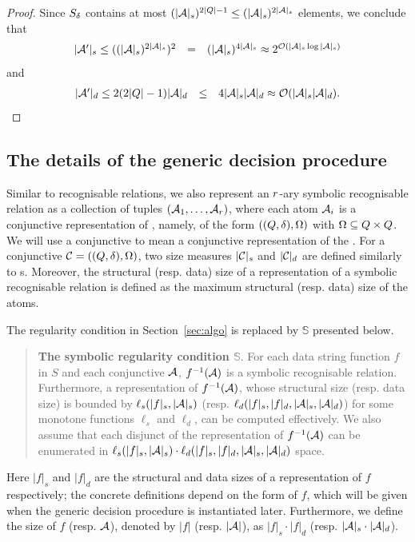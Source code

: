 \begin{proof}
Since $S_{\delta}$ contains at most $(|\mathcal{A}|_s)^{2 |Q|-1} \le (|\mathcal{A}|_s)^{2 |\mathcal{A}|_s}$ elements, we conclude that 
$$
\begin{array}{l c l}
|\mathcal{A}'|_s \le ((|\mathcal{A}|_s)^{2|\mathcal{A}|_s})^2  & = & (|\mathcal{A}|_s)^{4|\mathcal{A}|_s} 
 \approx    2^{\mathcal{O}\left(|\mathcal{A}|_s \log |\mathcal{A}|_s\right)}
\end{array}
$$ 
and 
$$
\begin{array}{l c l}
|\mathcal{A}'|_d \le 2(2|Q|-1) |\mathcal{A}|_d & \le & 4 |\mathcal{A}|_s |\mathcal{A}|_d 
\approx   \mathcal{O}( |\mathcal{A}|_s |\mathcal{A}|_d).
\end{array}
$$
\end{proof}




\subsection{The details of the generic decision procedure}


Similar to recognisable relations, we also represent an  $r$-ary symbolic recognisable relation as a collection of tuples $(\mathcal{A}_1, \ldots, \mathcal{A}_r)$, where each atom $\mathcal{A}_i$ is a conjunctive representation of \SA{}, namely, of the form $((Q, \delta), \Omega)$ with $\Omega \subseteq Q \times Q$. We will use a conjunctive \SA{} to mean a conjunctive representation of the \SA{}. For a conjunctive \SA{} $\mathcal{C}= ((Q, \delta), \Omega)$, two size measures $|\mathcal{C}|_s$ and $|\mathcal{C}|_d$ are defined similarly to \SA{}s. Moreover, the structural (resp. data) size of a representation of a symbolic recognisable relation is defined as the maximum structural (resp. data) size of the atoms.


The regularity condition \prerec{}  in Section~\ref{sec:algo} is replaced by $\mathbb{S}$\prerec{} presented below.
\begin{quote}
{\bf The symbolic regularity condition $\mathbb{S}$\prerec{}}. For each data string function $f$ in $S$ and each conjunctive \SA{} $\mathcal{A}$,  $f^{-1}(\mathcal{A})$ is a symbolic recognisable relation. Furthermore, 
a representation of $f^{-1}(\mathcal{A})$, whose structural size (resp. data size) is bounded by  $\ell_s(|f|_s, |\mathcal{A}|_s)$ (resp. $\ell_d(|f|_s,  |f|_d, |\mathcal{A}|_s, |\mathcal{A}|_d)$) for some monotone functions $\ell_s$ and $\ell_d$, can be computed effectively. We also assume that each disjunct of the representation of $f^{-1}(\mathcal{A})$ can be enumerated in $\ell_s(|f|_s, |\mathcal{A}|_s) \cdot \ell_d(|f|_s,  |f|_d, |\mathcal{A}|_s,  |\mathcal{A}|_d)$ space.
%
\end{quote} 
%
Here $|f|_s$ and $|f|_d$ are the structural and data sizes of a representation of $f$ respectively; the concrete definitions depend on the form of $f$, which will be given when the generic decision procedure is instantiated later. Furthermore, we define the size of $f$ (resp. $\mathcal{A}$), denoted by $|f|$ (resp. $|\mathcal{A}|$), as $|f|_s \cdot |f|_d$ (resp. $|\mathcal{A}|_s \cdot |\mathcal{A}|_d$).

